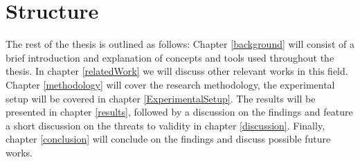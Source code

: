 \section{Structure}
The rest of the thesis is outlined as follows: Chapter \ref{background} will consist of a brief introduction and explanation of concepts and tools used throughout the thesis. In chapter \ref{relatedWork} we will discuss other relevant works in this field. Chapter \ref{methodology}  will cover the research methodology, the experimental setup will be covered in chapter \ref{ExperimentalSetup}. The results will be presented in chapter \ref{results}, followed by a discussion on the findings and feature a short discussion on the threats to validity in chapter \ref{discussion}. Finally, chapter \ref{conclusion} will conclude on the findings and discuss possible future works.
